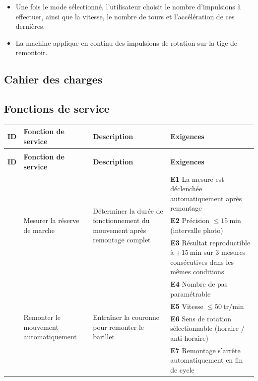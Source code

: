 \begin{itemize}
    \item Une fois le mode sélectionné, l'utilisateur choisit le nombre d'impulsions à effectuer, ainsi que la vitesse, le nombre de tours et l'accélération de ces dernières.
    \item La machine applique en continu des impulsions de rotation sur la tige de remontoir.
\end{itemize}

\begin{landscape}
\section{Cahier des charges}
\label{sec:cahier-charges}
\subsection{Fonctions de service}

\label{tab:cahier-fs}
\begin{longtable}{|>{\raggedright\arraybackslash}p{1cm}|p{4cm}|p{6cm}|p{10.5cm}|}
\hline
\textbf{ID} & \textbf{Fonction de service} & \textbf{Description} & \textbf{Exigences} \\
\hline
\endfirsthead

\multicolumn{4}{c}{\tablename\ \thetable{} (suite)} \\
\hline
\textbf{ID} & \textbf{Fonction de service} & \textbf{Description} & \textbf{Exigences} \\
\hline
\endhead

\hline
\endfoot

\multirow{3}{*}{FS1} & \multirow{3}{4cm}{Mesurer la réserve de marche} & \multirow{3}{6cm}{Déterminer la durée de fonctionnement du mouvement après remontage complet}
    & \rule[-0.4\baselineskip]{0pt}{1.8\baselineskip}\textbf{E1} La mesure est déclenchée automatiquement après remontage \\
\cline{4-4}
 & & & \rule[-0.4\baselineskip]{0pt}{1.8\baselineskip}\textbf{E2} Précision $\leq 15\ \mathrm{min}$ (intervalle photo) \\
\cline{4-4}
 & & & \rule[-0.4\baselineskip]{0pt}{1.8\baselineskip}\textbf{E3} Résultat reproductible à $\pm 15\ \mathrm{min}$ sur 3 mesures consécutives dans les mêmes conditions \\
\hline

\multirow{4}{*}{FS2} & \multirow{4}{4cm}{Remonter le mouvement automatiquement} & \multirow{4}{6cm}{Entraîner la couronne pour remonter le barillet}
    & \rule[-0.4\baselineskip]{0pt}{1.8\baselineskip}\textbf{E4} Nombre de pas paramétrable \\
\cline{4-4}
 & & & \rule[-0.4\baselineskip]{0pt}{1.8\baselineskip}\textbf{E5} Vitesse $\leq 50\ \mathrm{tr/min}$ \\
\cline{4-4}
 & & & \rule[-0.4\baselineskip]{0pt}{1.8\baselineskip}\textbf{E6} Sens de rotation sélectionnable (horaire / anti-horaire) \\
\cline{4-4}
 & & & \rule[-0.4\baselineskip]{0pt}{1.8\baselineskip}\textbf{E7} Remontage s'arrête automatiquement en fin de cycle \\
\hline


\end{longtable}
\end{landscape}
